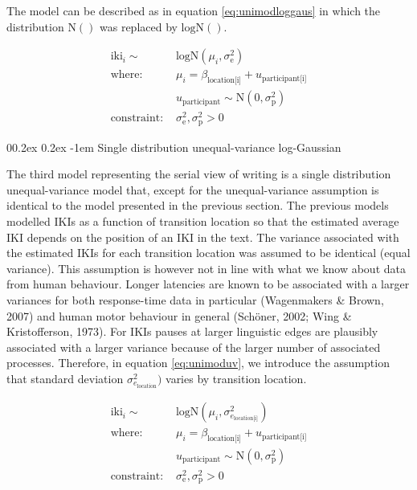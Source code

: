 \documentclass[
  english,
  man,floatsintext]{apa7}
\makeatletter
\let\oldparagraph\paragraph
\renewcommand{\paragraph}[1]{\oldparagraph{#1}\mbox{}}
\renewcommand{\paragraph}{\@startsection{paragraph}{4}{\parindent}%
  {0\baselineskip \@plus 0.2ex \@minus 0.2ex}%
  {-1em}%
  {\normalfont\normalsize\bfseries\itshape\typesectitle}}
\makeatother
\begin{document}
\begin{appendix}
The model can be described as in equation \ref{eq:unimodloggaus} in
which the distribution \(\text{N}()\) was replaced by \(\text{logN}()\).

\begin{equation}
\begin{aligned}
\label{eq:unimodloggaus}
\text{iki}_i \sim\text{ } & \text{logN}(\mu_i, \sigma_\text{e}^2) \\
\text{where: } &
\mu_i = \beta_\text{location[i]} + u_\text{participant[i]}\\
& u_\text{participant} \sim \text{N}(0, \sigma_\text{p}^2) \\
\text{constraint: } & \sigma_\text{e}^2, \sigma_\text{p}^2>0
\end{aligned}
\end{equation}

\hypertarget{single-distribution-unequal-variance-log-gaussian}{%
\paragraph{Single distribution unequal-variance
log-Gaussian}\label{single-distribution-unequal-variance-log-gaussian}}

The third model representing the serial view of writing is a single
distribution unequal-variance model that, except for the
unequal-variance assumption is identical to the model presented in the
previous section. The previous models modelled IKIs as a function of
transition location so that the estimated average IKI depends on the
position of an IKI in the text. The variance associated with the
estimated IKIs for each transition location was assumed to be identical
(equal variance). This assumption is however not in line with what we
know about data from human behaviour. Longer latencies are known to be
associated with a larger variances for both response-time data in
particular (Wagenmakers \& Brown, 2007) and human motor behaviour in
general (Schöner, 2002; Wing \& Kristofferson, 1973). For IKIs pauses at
larger linguistic edges are plausibly associated with a larger variance
because of the larger number of associated processes. Therefore, in
equation \ref{eq:unimoduv}, we introduce the assumption that standard
deviation \(\sigma_{e_\text{location}}^2)\) varies by transition
location.

\begin{equation}
\begin{aligned}
\label{eq:unimoduv}
\text{iki}_i \sim\text{ } & \text{logN}(\mu_i, \sigma_{e_\text{location[i]}}^2) \\
\text{where: } & \mu_i = \beta_\text{location[i]} + u_\text{participant[i]}\\
 & u_\text{participant} \sim \text{N}(0, \sigma_\text{p}^2) \\
 \text{constraint: } & \sigma_\text{e}^2, \sigma_\text{p}^2>0
\end{aligned}
\end{equation}


\end{appendix}
\end{document}
